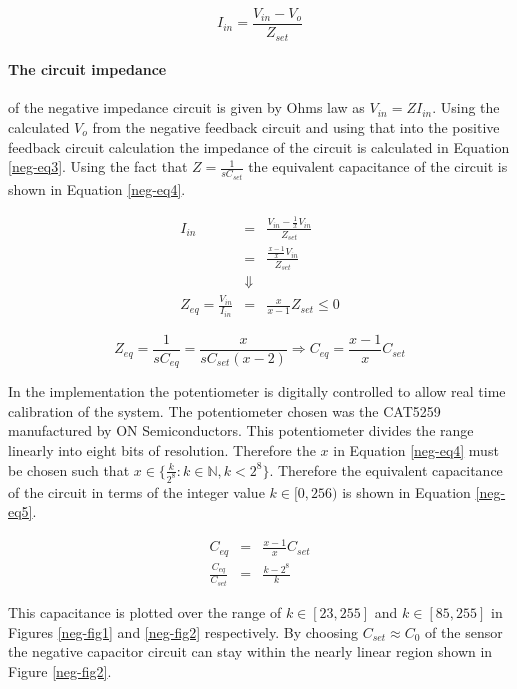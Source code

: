 \begin{equation}
	I_{in}=\frac{V_{in}-V_o}{Z_{set}}\label{neg-eq2}
\end{equation}

\paragraph{The circuit impedance} of the negative impedance circuit is given by Ohms law as $V_{in}=ZI_{in}$.  Using the calculated $V_o$ from the negative feedback circuit and using that into the positive feedback circuit calculation the impedance of the circuit is calculated in Equation \ref{neg-eq3}.  Using the fact that $Z=\frac{1}{sC_{set}}$ the equivalent capacitance of the circuit is shown in Equation \ref{neg-eq4}.

\begin{eqnarray}
	I_{in}&=&\frac{V_{in}-\frac{1}{x}V_{in}}{Z_{set}}\\
	&=&\frac{\frac{x-1}{x}V_{in}}{Z_{set}}\\
	&\Downarrow&\nonumber\\
	Z_{eq}=\frac{V_{in}}{I_{in}}&=&\frac{x}{x-1}Z_{set}\leq0\label{neg-eq3}
\end{eqnarray}

\begin{equation}
	Z_{eq}=\frac{1}{sC_{eq}}=\frac{x}{sC_{set}(x-2)}\Rightarrow C_{eq}=\frac{x-1}{x}C_{set}\label{neg-eq4}
\end{equation}

In the implementation the potentiometer is digitally controlled to allow real time calibration of the system.  The potentiometer chosen was the CAT5259 manufactured by ON Semiconductors.  This potentiometer divides the range linearly into eight bits of resolution.  Therefore the $x$ in Equation \ref{neg-eq4} must be chosen such that $x\in\{\frac{k}{2^8}: k\in\mathbb{N}, k<2^8\}$.  Therefore the equivalent capacitance of the circuit in terms of the integer value $k\in[0,256)$ is shown in Equation \ref{neg-eq5}.

\begin{eqnarray}
	C_{eq}&=&\frac{x-1}{x}C_{set}\label{neg-eq6}\\
	\frac{C_{eq}}{C_{set}}&=&\frac{k-2^8}{k}\label{neg-eq5}
\end{eqnarray}

This capacitance is plotted over the range of $k\in[23,255]$ and $k\in[85,255]$ in Figures \ref{neg-fig1} and \ref{neg-fig2} respectively.  By choosing $C_{set}\approx C_0$ of the sensor the negative capacitor circuit can stay within the nearly linear region shown in Figure \ref{neg-fig2}.

